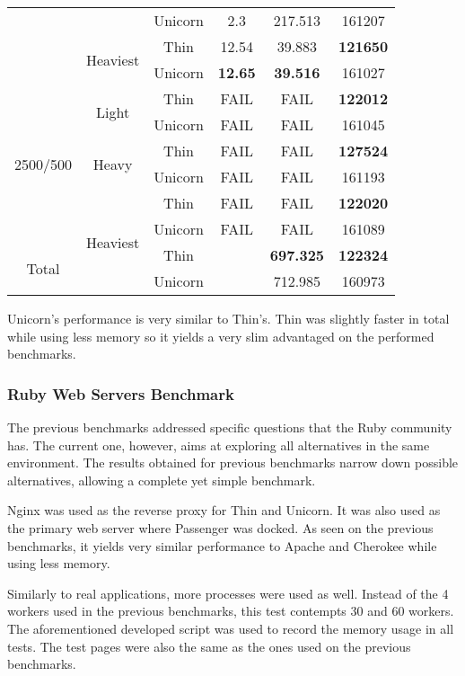 \begin{table}[ht]
\begin{tabular}{|c|c|c|c|c|c|}
 &  & Unicorn & 2.3 & 217.513 & 161207\\\cline{2-6}
 & \multirow{2}{*}{Heaviest} & Thin & 12.54 & 39.883 & \textbf{121650}\\\cline{3-6}
 &  & Unicorn & \textbf{12.65} & \textbf{39.516} & 161027\\\hline
\multirow{6}{*}{2500/500} & \multirow{2}{*}{Light} & Thin & FAIL & FAIL & \textbf{122012}\\\cline{3-6}
 &  & Unicorn & FAIL & FAIL & 161045\\\cline{2-6}
 & \multirow{2}{*}{Heavy} & Thin & FAIL & FAIL & \textbf{127524}\\\cline{3-6}
 &  & Unicorn & FAIL & FAIL & 161193\\\cline{2-6}
 & \multirow{4}{*}{Heaviest} & Thin & FAIL & FAIL & \textbf{122020}\\\cline{3-6}
 &  & Unicorn & FAIL & FAIL & 161089\\\hline
\multirow{2}{*}{Total} &  & Thin &  & \textbf{697.325} & \textbf{122324}\\\cline{2-6}
 &  & Unicorn &  & 712.985 & 160973\\\hline
  \end{tabular}
  
  \label{tab:thin_unicorn_benchmark}
\end{table}

Unicorn's performance is very similar to Thin's. Thin was slightly faster in total while using less memory so it yields a very slim advantaged on the performed benchmarks.

\subsubsection{Ruby Web Servers Benchmark}
The previous benchmarks addressed specific questions that the Ruby community has. The current one, however, aims at exploring all alternatives in the same environment. The results obtained for previous benchmarks narrow down possible alternatives, allowing a complete yet simple benchmark. 

Nginx was used as the reverse proxy for Thin and Unicorn. It was also used as the primary web server where Passenger was docked. As seen on the previous benchmarks, it yields very similar performance to Apache and Cherokee while using less memory.

Similarly to real applications, more processes were used as well. Instead of the 4 workers used in the previous benchmarks, this test contempts 30 and 60 workers. The aforementioned developed script was used to record the memory usage in all tests. The test pages were also the same as the ones used on the previous benchmarks.

